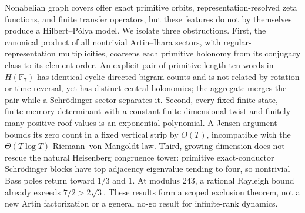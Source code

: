 Nonabelian graph covers offer exact primitive orbits, representation-resolved
zeta functions, and finite transfer operators, but these features do not by
themselves produce a Hilbert--Pólya model. We isolate three obstructions.
First, the canonical product of all nontrivial Artin--Ihara sectors, with
regular-representation multiplicities, coarsens each primitive holonomy from
its conjugacy class to its element order. An explicit pair of primitive
length-ten words in \(H(\mathbb F_7)\) has identical cyclic directed-bigram
counts and is not related by rotation or time reversal, yet has distinct
central holonomies; the aggregate merges the pair while a Schrödinger sector
separates it. Second, every fixed finite-state, finite-memory determinant with
a constant finite-dimensional twist and finitely many positive roof values is
an exponential polynomial. A Jensen argument bounds its zero count in a
fixed vertical strip by \(O(T)\), incompatible with the
\(\Theta(T\log T)\) Riemann--von Mangoldt law. Third, growing dimension does
not rescue the natural Heisenberg congruence tower: primitive
exact-conductor Schrödinger blocks have top adjacency eigenvalue tending to
four, so nontrivial Bass poles return toward \(1/3\) and \(1\). At modulus
243, a rational Rayleigh bound already exceeds \(7/2>2\sqrt3\). These results
form a scoped exclusion theorem, not a new Artin factorization or a general
no-go result for infinite-rank dynamics.
